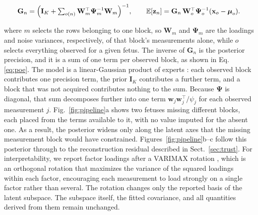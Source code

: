 \documentclass[a4paper,fleqn]{cas-sc}
\begin{document}
\begin{equation}
    \mathbf{G}_n
    =
    \Bigl(\mathbf{I}_K
    +
    \textstyle\sum_{o(n)}
    \mathbf{W}_{m}^{\top}\boldsymbol{\Psi}_{m}^{-1}\mathbf{W}_{m}
    \Bigr)^{-1},
    \qquad
    \mathbb{E}[\mathbf{z}_n]
    =
    \mathbf{G}_n\,\mathbf{W}_{o}^{\top}\boldsymbol{\Psi}_{o}^{-1}
    (\mathbf{x}_{o}-\boldsymbol{\mu}_o).
    \label{eq:poe}
\end{equation}

where $m$ selects the rows belonging to one block, so $\mathbf{W}_{m}$ and $\boldsymbol{\Psi}_{m}$ are the loadings and noise variances, respectively, of that block's measurements alone, while $o$ selects everything observed for a given fetus.
The inverse of $\mathbf{G}_n$ is the posterior precision, and it is a sum of one term per observed block, as shown in Eq. \ref{eq:poe}. The model is a linear-Gaussian product of experts \cite{ref:poe}: each observed block contributes one precision term, the prior $\mathbf{I}_K$ contributes a further term, and a block that was not acquired contributes nothing to the sum. Because $\boldsymbol{\Psi}$ is diagonal, that sum decomposes further into one term $\mathbf{w}_j\mathbf{w}_j^{\top}/\psi_j$ for each observed measurement $j$. Fig.~\ref{fig:pipeline}a shows two fetuses missing different blocks, each placed from the terms available to it, with no value imputed for the absent one. As a result, the posterior widens only along the latent axes that the missing measurement block would have constrained. Figures~\ref{fig:pipeline}b–c follow this posterior through to the reconstruction residual described in Sect.~\ref{sec:trust}. For interpretability, we report factor loadings after a VARIMAX rotation \cite{ref:varimax}, which is an orthogonal rotation that maximizes the variance of the squared loadings within each factor, encouraging each measurement to load strongly on a single factor rather than several. The rotation changes only the reported basis of the latent subspace. The subspace itself, the fitted covariance, and all quantities derived from them remain unchanged.
\end{document}
